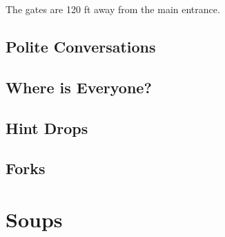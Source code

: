 \documentclass[twocolumn]{dndbook}
\begin{document}
The gates are 120 ft away from the main entrance.\par



\subsection{Polite Conversations}

















\subsection{Where is Everyone?}
\subsection{Hint Drops}

\subsection{Forks}



\section{Soups}
\end{document}
